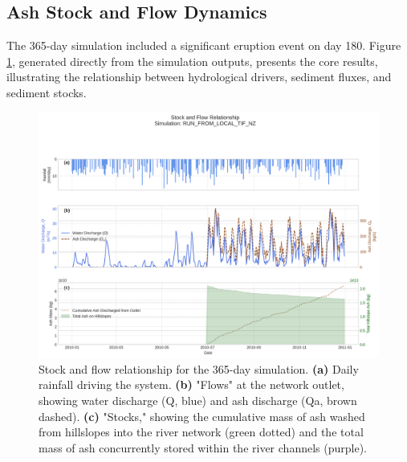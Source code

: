\documentclass[12pt, a4paper]{article}
\begin{document}
\subsection{Ash Stock and Flow Dynamics}
The 365-day simulation included a significant eruption event on day 180. Figure \ref{fig:stockflow}, generated directly from the simulation outputs, presents the core results, illustrating the relationship between hydrological drivers, sediment fluxes, and sediment stocks.




\begin{figure}[H]
    \centering
    \includegraphics[width=1\linewidth]{stock_flow.png}
    \caption{Stock and flow relationship for the 365-day simulation. \textbf{(a)} Daily rainfall driving the system. \textbf{(b)} "Flows" at the network outlet, showing water discharge (Q, blue) and ash discharge (Qa, brown dashed). \textbf{(c)} "Stocks," showing the cumulative mass of ash washed from hillslopes into the river network (green dotted) and the total mass of ash concurrently stored within the river channels (purple).}
    \label{fig:stockflow}
\end{figure}
\end{document}

